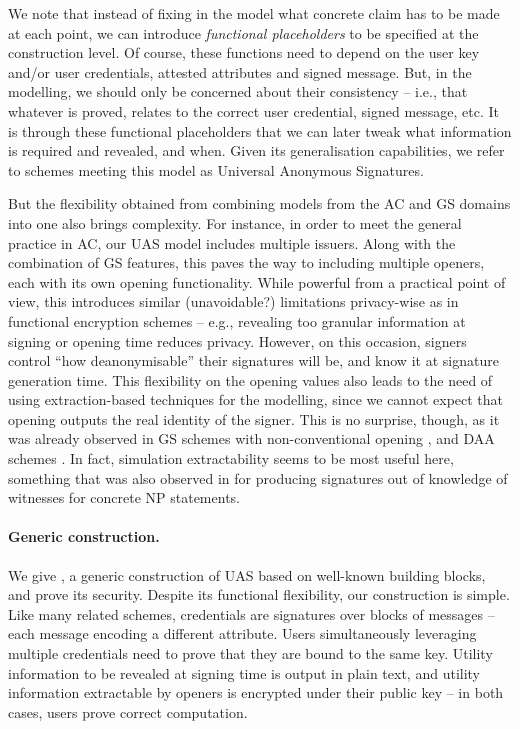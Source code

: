 We note that instead of fixing in the model what concrete claim has to
be made at each point, we can introduce \emph{functional placeholders} to be
specified at the construction level. Of course, these functions need
to depend on the user key and/or user credentials, attested attributes and
signed message. But, in the modelling, we should only be concerned about their
consistency -- i.e., that whatever is proved, relates to the correct user
credential, signed message, etc.
%
It is through these functional placeholders that we can later tweak what
information is required and revealed, and when. Given its generalisation
capabilities, we refer to schemes meeting this model as Universal Anonymous
Signatures.

But the flexibility obtained from combining models from the AC and GS
domains into one also brings complexity. For instance, in order to meet
the general practice in AC, our UAS model includes multiple issuers. Along with
the combination of GS features, this paves the way to including multiple
openers, each with its own opening functionality. While powerful from a
practical point of view, this introduces similar (unavoidable?) limitations
privacy-wise as in functional encryption schemes \cite{bsw11} -- e.g., revealing
too granular information at signing or opening time reduces privacy. However, on
this occasion, signers control ``how deanonymisable'' their signatures will
be, and know it at signature generation time. This flexibility on the opening
values also leads to the need of using extraction-based techniques for the
modelling, since we cannot expect that opening outputs the real identity of the
signer. This is no surprise, though, as it was already observed in GS schemes
with non-conventional opening \cite{dl21}, and DAA schemes \cite{cdl16,cdl16b}.
In fact, simulation extractability seems to be most useful here, something that
was also observed in \cite{cl06} for producing signatures out of knowledge of
witnesses for concrete NP statements.

\paragraph{Generic construction.} %
We give \CUASGen, a generic construction of UAS based on well-known
building blocks, and prove its security. Despite its functional flexibility, our
construction is simple. Like many related schemes, credentials are
signatures over blocks of messages -- each message encoding a different
attribute. Users simultaneously leveraging multiple credentials need to prove
that they are bound to the same key. Utility information to be revealed at
signing time is output in plain text, and utility information extractable by
openers is encrypted under their public key -- in both cases, users prove
correct computation.

